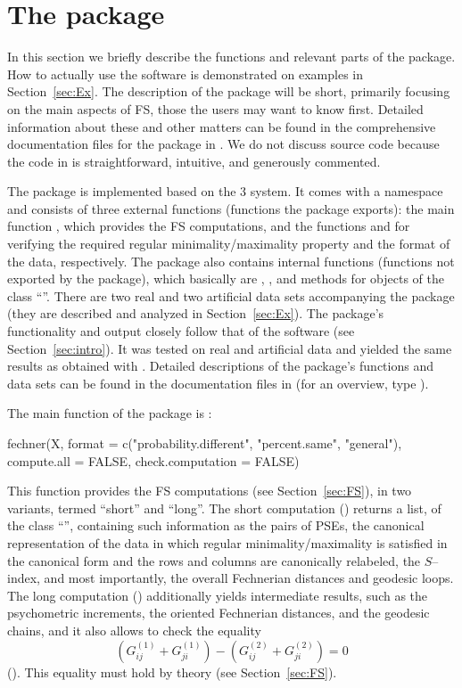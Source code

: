 \documentclass[nojss]{jss}
\begin{document}
\section[The R package fechner]{The  package }
\label{sec:fechner}

In this section we briefly describe the functions and relevant parts of the package. 
How to actually use the software is demonstrated on examples in Section~\ref{sec:Ex}.
The description of the package will be short, primarily focusing on the main aspects of FS, those the users may want to know first. 
Detailed information about these and other matters can be found in the comprehensive documentation files
for the package in . We do not discuss source code because the code in  is straightforward, intuitive, 
and generously commented.

The package  is implemented based on the 3 system.  
It comes with a namespace and consists of three external functions (functions the package exports):
the main function , which provides the FS computations, and the functions  
and  for verifying the required regular minimality/maximality property and the format of the data, 
respectively. The package also contains internal functions (functions not exported by the package), which basically 
are , , and  methods for objects of the class ``''.
There are two real and two artificial data sets accompanying the package  
(they are described and analyzed in Section~\ref{sec:Ex}).
The package's functionality and output closely follow that of the software  (see Section~\ref{sec:intro}). 
It was tested on real and artificial data and yielded the same results 
as obtained with .
Detailed descriptions of the package's functions and data sets can be found in the documentation
files in  (for an overview, type ).

The main function of the package is : 
\begin{Code}
fechner(X, format = c("probability.different", "percent.same", "general"), 
  compute.all = FALSE, check.computation = FALSE)
\end{Code}
This function provides the FS computations (see Section~\ref{sec:FS}), in two variants, termed ``short'' and ``long''. 
The short computation () returns a list, of the class ``'', 
containing such information as the pairs of PSEs, the canonical representation of the data 
in which regular minimality/maximality is satisfied in the canonical form and the rows and columns are canonically relabeled, 
the $S$--index, and most importantly, the overall Fechnerian distances and geodesic loops. 
The long computation () additionally yields intermediate results, 
such as the psychometric increments, the oriented Fechnerian distances, and the geodesic chains, 
and it also allows to check the equality
\[
\left(G_{ij}^{(1)}+G_{ji}^{(1)}\right) - \left(G_{ij}^{(2)}+G_{ji}^{(2)}\right) = 0
\]
(). This equality must hold by theory (see Section~\ref{sec:FS}).
\end{document}
